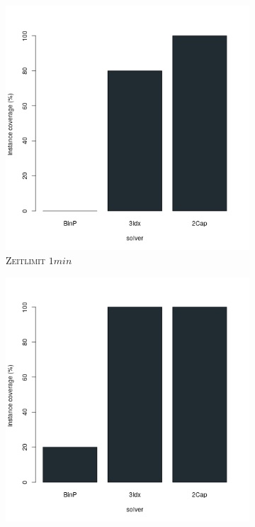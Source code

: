 \begin{figure}[H]
\centering

\begin{subfigure}[b]{0.3\textwidth}
\centering
\includegraphics[width=1.2\textwidth]{img/solver_instance_coverage_b=2_m_60s.png}
\caption{\textsc{Zeitlimit} $1min$}
\label{fig:instance_cov_b=2_m_a}
\end{subfigure}
\hfill
\begin{subfigure}[b]{0.3\textwidth}
\centering
\includegraphics[width=1.2\textwidth]{img/solver_instance_coverage_b=2_m_600s.png}

\end{subfigure}
\end{figure}
